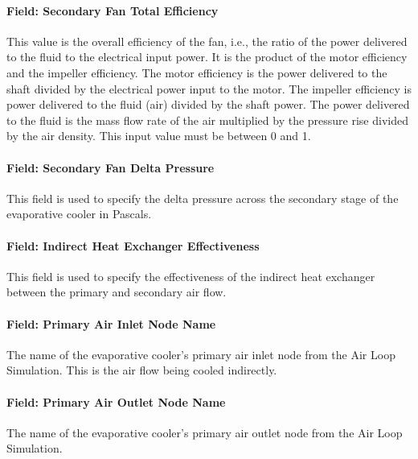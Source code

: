 \paragraph{Field: Secondary Fan Total Efficiency}\label{field-secondary-fan-total-efficiency}

This value is the overall efficiency of the fan, i.e., the ratio of the power delivered to the fluid to the electrical input power. It is the product of the motor efficiency and the impeller efficiency. The motor efficiency is the power delivered to the shaft divided by the electrical power input to the motor. The impeller efficiency is power delivered to the fluid (air) divided by the shaft power. The power delivered to the fluid is the mass flow rate of the air multiplied by the pressure rise divided by the air density. This input value must be between 0 and 1.

\paragraph{Field: Secondary Fan Delta Pressure}\label{field-secondary-fan-delta-pressure}

This field is used to specify the delta pressure across the secondary stage of the evaporative cooler in Pascals.

\paragraph{Field: Indirect Heat Exchanger Effectiveness}\label{field-indirect-heat-exchanger-effectiveness}

This field is used to specify the effectiveness of the indirect heat exchanger between the primary and secondary air flow.

\paragraph{Field: Primary Air Inlet Node Name}\label{field-primary-air-inlet-node-name-000}

The name of the evaporative cooler's primary air inlet node from the Air Loop Simulation. This is the air flow being cooled indirectly.

\paragraph{Field: Primary Air Outlet Node Name}\label{field-primary-air-outlet-node-name-000}

The name of the evaporative cooler's primary air outlet node from the Air Loop Simulation.

